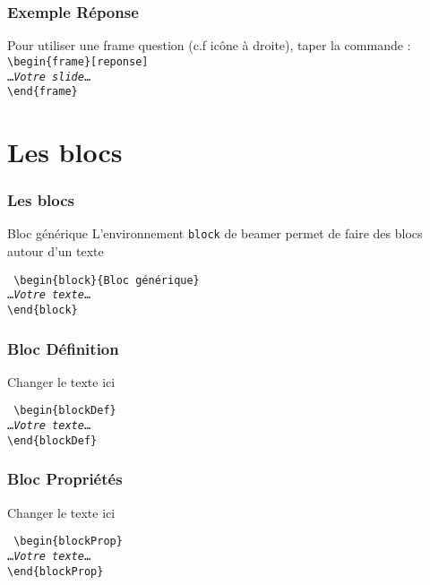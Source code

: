 \documentclass[aspectratio=169]{beamer}
\begin{document}
\begin{frame}[reponse]
    \frametitle{Exemple \og Réponse\fg}

Pour utiliser une frame question (c.f icône à droite), taper la commande :
\noindent\texttt{%
\textbackslash begin\{frame\}[reponse]\\
\ldots\emph{Votre slide}\ldots\\
\textbackslash end\{frame\}
}
\end{frame}
\section{Les blocs}
\begin{frame}
\frametitle{Les \og blocs\fg}
\begin{block}{Bloc générique}
L'environnement \texttt{block} de beamer permet de faire des blocs
autour d'un texte
\end{block}
\noindent\texttt{%
\textbackslash begin\{block\}\{Bloc générique\}\\
\ldots\emph{Votre texte}\ldots\\
\textbackslash end\{block\}
}%
\end{frame}
\begin{frame}
\frametitle{Bloc \og Définition\fg}
\begin{blockDef}
Changer le texte ici
\end{blockDef}
\noindent\texttt{%
\textbackslash begin\{blockDef\}\\
\ldots\emph{Votre texte}\ldots\\
\textbackslash end\{blockDef\}
}%
\end{frame}
\begin{frame}
    \frametitle{Bloc \og Propriétés\fg}
    \begin{blockProp}
        Changer le texte ici
    \end{blockProp}
\noindent\texttt{%
\textbackslash begin\{blockProp\}\\
\ldots\emph{Votre texte}\ldots\\
\textbackslash end\{blockProp\}
}%
\end{frame}
\end{document}
